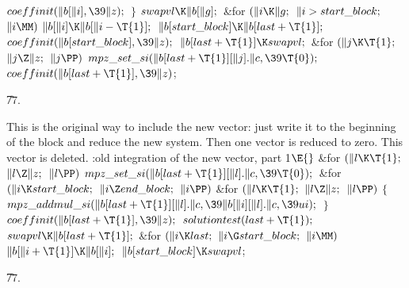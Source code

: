 ${}\\{coeffinit}(\|b[\|i],\39\|z);{}$\6
\4${}\}{}$\2\6
${}\\{swapvl}\K\|b[\|g];{}$\6
\&{for} ${}(\|i\K\|g;{}$ ${}\|i>\\{start\_block};{}$ ${}\|i\MM){}$\1\5
${}\|b[\|i]\K\|b[\|i-\T{1}];{}$\2\6
${}\|b[\\{start\_block}]\K\|b[\\{last}+\T{1}];{}$\6
${}\\{coeffinit}(\|b[\\{start\_block}],\39\|z);{}$\6
${}\|b[\\{last}+\T{1}]\K\\{swapvl};{}$\6
\&{for} ${}(\|j\K\T{1};{}$ ${}\|j\Z\|z;{}$ ${}\|j\PP){}$\1\5
${}\\{mpz\_set\_si}(\|b[\\{last}+\T{1}][\|j].\|c,\39\T{0});{}$\2\6
${}\\{coeffinit}(\|b[\\{last}+\T{1}],\39\|z){}$;\par
\U77.\fi

This is the original way to  include the new vector:
just write it to the beginning of the block and reduce
the new system. Then one vector is reduced to zero.
This vector is deleted.
\Y\B\4:old integration of the new vector, part 1\X${}\E{}$\6
\&{for} ${}(\|l\K\T{1};{}$ ${}\|l\Z\|z;{}$ ${}\|l\PP){}$\1\5
${}\\{mpz\_set\_si}(\|b[\\{last}+\T{1}][\|l].\|c,\39\T{0});{}$\2\6
\&{for} ${}(\|i\K\\{start\_block};{}$ ${}\|i\Z\\{end\_block};{}$ ${}\|i\PP){}$%
\1\6
\&{for} ${}(\|l\K\T{1};{}$ ${}\|l\Z\|z;{}$ ${}\|l\PP){}$\5
${}\{{}$\1\6
${}\\{mpz\_addmul\_si}(\|b[\\{last}+\T{1}][\|l].\|c,\39\|b[\|i][\|l].\|c,\39%
\\{ui});{}$\6
\4${}\}{}$\2\2\6
${}\\{coeffinit}(\|b[\\{last}+\T{1}],\39\|z);{}$\6
${}\\{solutiontest}(\\{last}+\T{1});{}$\6
${}\\{swapvl}\K\|b[\\{last}+\T{1}];{}$\6
\&{for} ${}(\|i\K\\{last};{}$ ${}\|i\G\\{start\_block};{}$ ${}\|i\MM){}$\1\5
${}\|b[\|i+\T{1}]\K\|b[\|i];{}$\2\6
${}\|b[\\{start\_block}]\K\\{swapvl}{}$;\par
\U77.\fi

